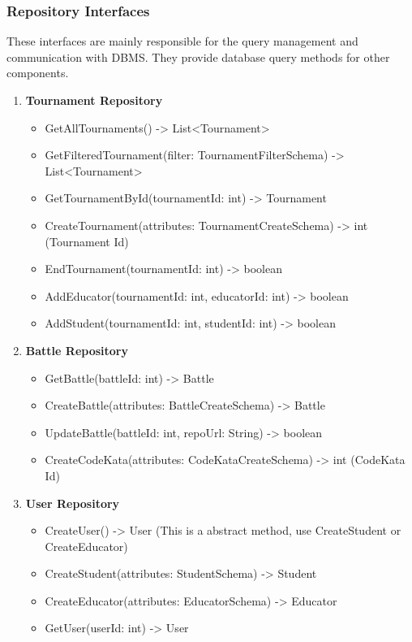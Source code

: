 \subsubsection{Repository Interfaces}
These interfaces are mainly responsible for the query management and communication with DBMS. They provide database query methods for other components. 
\begin{enumerate}
    \item \textbf{Tournament Repository}
    \begin{itemize}
        \item GetAllTournaments() -> List<Tournament> 
        \item GetFilteredTournament(filter: TournamentFilterSchema) -> List<Tournament>\\
        \item GetTournamentById(tournamentId: int) -> Tournament
        \item CreateTournament(attributes: TournamentCreateSchema) -> int (Tournament Id)
        \item EndTournament(tournamentId: int) -> boolean
        \item AddEducator(tournamentId: int, educatorId: int) -> boolean
        \item AddStudent(tournamentId: int, studentId: int) -> boolean
    \end{itemize}  
    \item \textbf{Battle Repository}
    \begin{itemize}
        \item GetBattle(battleId: int) -> Battle
        \item CreateBattle(attributes: BattleCreateSchema) -> Battle
        \item UpdateBattle(battleId: int, repoUrl: String) -> boolean
        \item CreateCodeKata(attributes: CodeKataCreateSchema) -> int (CodeKata Id)
    \end{itemize}
    \item \textbf{User Repository}
    \begin{itemize}
        \item CreateUser() -> User (This is a abstract method, use CreateStudent or CreateEducator)
        \item CreateStudent(attributes: StudentSchema) -> Student
        \item CreateEducator(attributes: EducatorSchema) -> Educator
        \item GetUser(userId: int) -> User

\end{itemize}
\end{enumerate}
